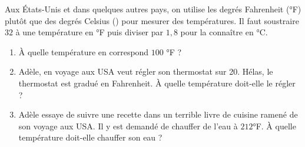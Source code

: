 
\begin{exercice}\label{exosmath-0846}

    Aux États-Unis et dans quelques autres pays, on utilise les degrés Fahrenheit (°F) plutôt que des degrés Celsius (\si{\degreecelsius}) pour mesurer des températures. Il faut soustraire $32$ à une température en °F puis diviser par $1,8$ pour la connaître en °C.  

\begin{enumerate}
    \item
        À quelle température en \si{\degreecelsius} correspond \( 100 \) °F ?
    \item
        Adèle, en voyage aux USA veut régler son thermostat sur \SI{20}{\degreecelsius}. Hélas, le thermostat est gradué en Fahrenheit. À quelle température doit-elle le régler ?
    \item
        Adèle essaye de suivre une recette dans un terrible livre de cuisine ramené de son voyage aux USA. Il y est demandé de chauffer de l'eau à \( 212\)°F. À quelle température doit-elle chauffer son eau ?
\end{enumerate}

\end{exercice}
